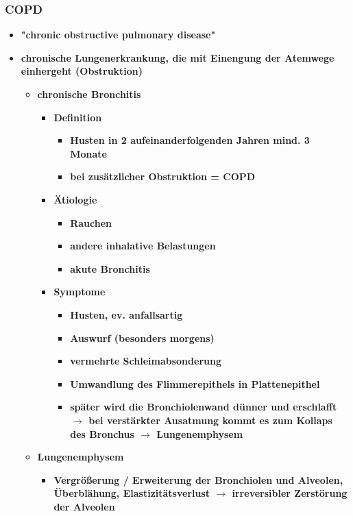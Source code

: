	\subsubsection{COPD}
		\begin{itemize}
			\item \textbf{"chronic obstructive pulmonary disease"}
			\item \textbf{chronische Lungenerkrankung, die mit Einengung der Atemwege einhergeht (Obstruktion)}
				\begin{itemize}
					\item \textbf{chronische Bronchitis}
						\begin{itemize}
							\item \textbf{Definition}
								\begin{itemize}
									\item \textbf{Husten in 2 aufeinanderfolgenden Jahren mind. 3 Monate}
									\item \textbf{bei zusätzlicher Obstruktion = COPD}
								\end{itemize}
							\item \textbf{Ätiologie}
								\begin{itemize}
									\item \textbf{Rauchen}
									\item \textbf{andere inhalative Belastungen}
									\item \textbf{akute Bronchitis}
								\end{itemize}
				\pagebreak
							\item \textbf{Symptome}
								\begin{itemize}
									\item \textbf{Husten, ev. anfallsartig}
									\item \textbf{Auswurf (besonders morgens)}
									\item \textbf{vermehrte Schleimabsonderung}
									\item \textbf{Umwandlung des Flimmerepithels in Plattenepithel}
									\item \textbf{später wird die Bronchiolenwand dünner und erschlafft $\rightarrow$ bei verstärkter Ausatmung kommt es zum Kollaps des Bronchus $\rightarrow$ Lungenemphysem}
								\end{itemize}
						\end{itemize}
					\item \textbf{Lungenemphysem}
						\begin{itemize}
							\item \textbf{Vergrößerung / Erweiterung der Bronchiolen und Alveolen, Überblähung, Elastizitätsverlust $\rightarrow$ irreversibler Zerstörung der Alveolen}

\end{itemize}
\end{itemize}
\end{itemize}
